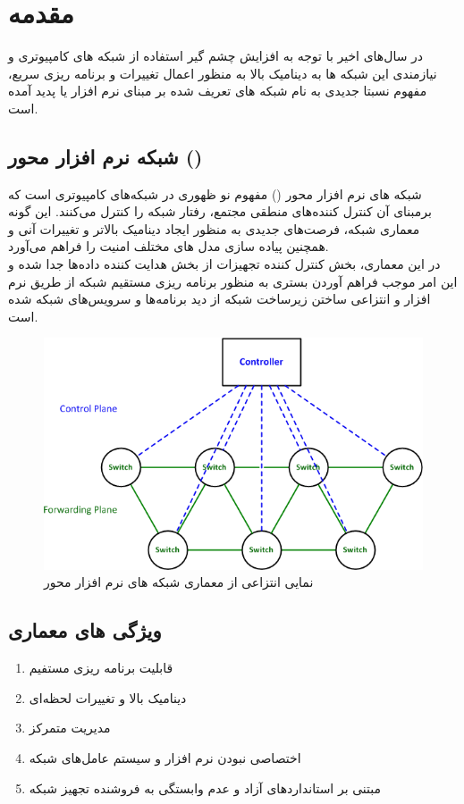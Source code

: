 \chapter{مقدمه}

در سال‌های اخیر با توجه به افزایش چشم گیر استفاده از شبکه های کامپیوتری و نیازمندی این شبکه ها به دینامیک بالا به منظور اعمال تغییرات و برنامه ریزی سریع، مفهوم نسبتا جدیدی به نام شبکه های تعریف شده بر مبنای نرم افزار یا  پدید آمده است.\\

\section{شبکه نرم افزار محور ()}
 
شبکه های نرم افزار محور () مفهوم نو ظهوری در شبکه‌های کامپیوتری است که برمبنای آن کنترل کننده‌های منطقی مجتمع، رفتار شبکه را کنترل می‌کنند. این گونه معماری شبکه، فرصت‌های جدیدی به منظور ایجاد دینامیک بالاتر و تغییرات آنی و همچنین پیاده سازی مدل های مختلف امنیت را فراهم می‌آورد.\\
در این معماری، بخش کنترل کننده تجهیزات از بخش هدایت کننده داده‌ها جدا شده و این امر موجب فراهم آوردن بستری به منظور برنامه ریزی مستقیم شبکه از طریق نرم افزار و انتزاعی ساختن زیرساخت شبکه از دید برنامه‌ها و سرویس‌های شبکه شده است.\\

\begin{figure}
	\centering
	\includegraphics{imgs/SDN_controller.png}
	\caption{نمایی انتزاعی از معماری شبکه های نرم افزار محور}
	\label{fig1}
\end{figure}

\section{ویژگی های معماری }
\begin{enumerate}
	\item قابلیت برنامه ریزی مستفیم
	\item دینامیک بالا و تغییرات لحظه‌ای
	\item مدیریت متمرکز
	\item اختصاصی نبودن نرم افزار و سیستم عامل‌های شبکه
	\item مبتنی بر استاندارد‌های آزاد و عدم وابستگی به فروشنده تجهیز شبکه
\end{enumerate}

